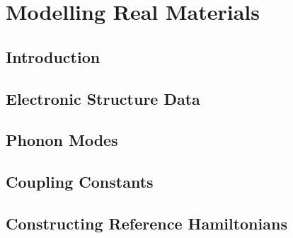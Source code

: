 
\chapter{Modelling Real Materials} %

\label{Chapter5} %


\section{Introduction}

\section{Electronic Structure Data}

\section{Phonon Modes}

\section{Coupling Constants}

\section{Constructing Reference Hamiltonians}
